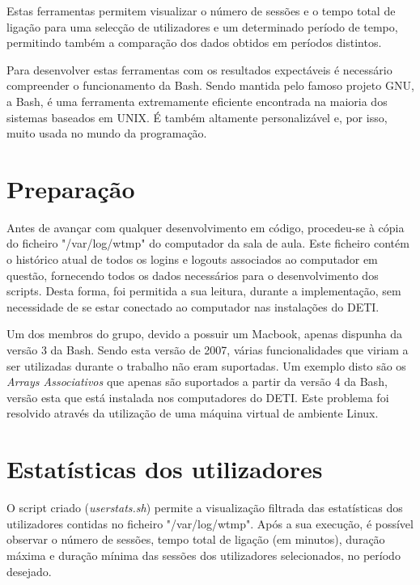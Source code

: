 \documentclass[10pt,portuguese]{article}
\begin{document}
\par Estas ferramentas permitem visualizar o número de sessões e o tempo total de ligação para uma selecção de utilizadores e um determinado período de tempo, permitindo também a comparação dos dados obtidos em períodos distintos.

\par Para desenvolver estas ferramentas com os resultados expectáveis é necessário compreender o funcionamento da Bash. Sendo mantida pelo famoso projeto GNU, a Bash, é uma ferramenta extremamente eficiente encontrada na maioria dos sistemas baseados em UNIX. É também altamente personalizável e, por isso, muito usada no mundo da programação.
 

\clearpage

\section{Preparação}
\par Antes de avançar com qualquer desenvolvimento em código, procedeu-se à cópia do ficheiro "/var/log/wtmp" do computador da sala de aula. Este ficheiro contém o histórico atual de todos os logins e logouts associados ao computador em questão, fornecendo todos os dados necessários para o desenvolvimento dos scripts. Desta forma, foi permitida a sua leitura, durante a implementação, sem necessidade de se estar conectado ao computador nas instalações do DETI.
\par Um dos membros do grupo, devido a possuir um Macbook, apenas dispunha da versão 3 da Bash. Sendo esta versão de 2007, várias funcionalidades que viriam a ser utilizadas durante o trabalho não eram suportadas. Um exemplo disto são os \textit{Arrays Associativos} que apenas são suportados a partir da versão 4 da Bash, versão esta que está instalada nos computadores do DETI. Este problema foi resolvido através da utilização de uma máquina virtual de ambiente Linux.


\clearpage

\section{Estatísticas dos utilizadores}
O script criado (\textit{userstats.sh}) permite a visualização filtrada das estatísticas dos utilizadores contidas no ficheiro "/var/log/wtmp". Após a sua execução, é possível observar o número de sessões, tempo total de ligação (em minutos), duração máxima e duração mínima das sessões dos utilizadores selecionados, no período desejado.
\end{document}
